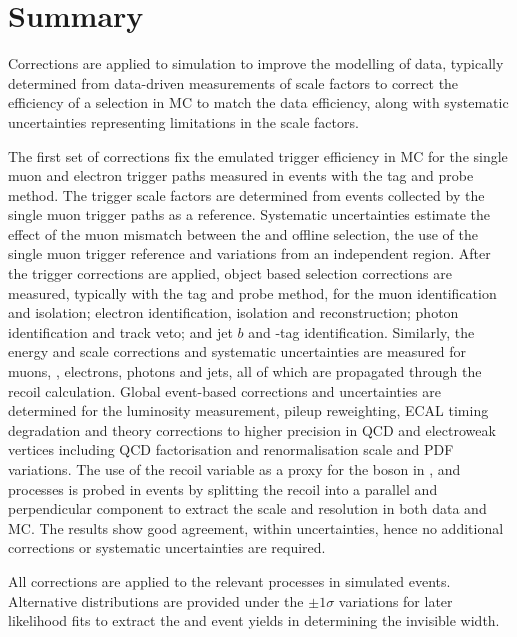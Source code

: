 \clearpage
\section{Summary}

Corrections are applied to simulation to improve the modelling of data, typically determined from data-driven measurements of scale factors to correct the efficiency of a selection in MC to match the data efficiency, along with systematic uncertainties representing limitations in the scale factors.

The first set of corrections fix the emulated trigger efficiency in MC for the single muon and electron trigger paths measured in \IDYll events with the tag and probe method. The \ptmiss trigger scale factors are determined from events collected by the single muon trigger paths as a reference. Systematic uncertainties estimate the effect of the muon mismatch between the \SWT and offline selection, the use of the single muon trigger reference and variations from an independent region. After the trigger corrections are applied, object based selection corrections are measured, typically with the tag and probe method, for the muon identification and isolation; electron identification, isolation and reconstruction; photon identification and track veto; and jet $b$ and \Ptauh-tag identification.  Similarly, the energy and \pt scale corrections and systematic uncertainties are measured for muons, \Ptauh, electrons, photons and jets, all of which are propagated through the recoil calculation. Global event-based corrections and uncertainties are determined for the luminosity measurement, pileup reweighting, ECAL timing degradation and theory corrections to higher precision in QCD and electroweak vertices including QCD factorisation and renormalisation scale and PDF variations. The use of the recoil variable as a proxy for the boson \pt in \IZvvj, \IWlvj and \IDYllj processes is probed in \IDYllj events by splitting the recoil into a parallel and perpendicular component to extract the scale and resolution in both data and MC. The results show good agreement, within uncertainties, hence no additional corrections or systematic uncertainties are required.

All corrections are applied to the relevant processes in simulated events. Alternative distributions are provided under the $\pm 1\sigma$ variations for later likelihood fits to extract the \IZvvj and \IZllj event yields in determining the \PZ invisible width.
